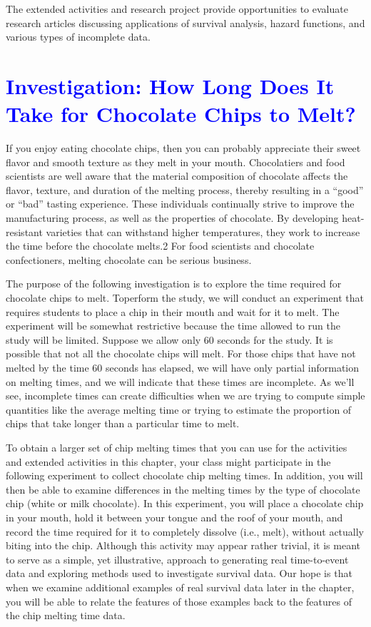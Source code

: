 \documentclass[
]{report}
\begin{document}
The extended activities and research project provide opportunities to evaluate research articles discussing applications of survival analysis, hazard functions, and various types of incomplete data.

\newpage

\hypertarget{section-77}{%
\section{\texorpdfstring{\textcolor{blue}{Investigation: How Long Does It Take for Chocolate Chips to Melt?}}{}}\label{section-77}}

If you enjoy eating chocolate chips, then you can probably appreciate their sweet flavor and smooth texture as they melt in your mouth. Chocolatiers and food scientists are well aware that the material composition of chocolate affects the flavor, texture, and duration of the melting process, thereby resulting in a ``good'' or ``bad'' tasting experience. These individuals continually strive to improve the manufacturing process, as well as the properties of chocolate. By developing heat-resistant varieties that can withstand higher temperatures, they work to increase the time before the chocolate melts.2 For food scientists and chocolate confectioners, melting chocolate can be serious business.

The purpose of the following investigation is to explore the time required for chocolate chips to melt. Toperform the study, we will conduct an experiment that requires students to place a chip in their mouth and wait for it to melt. The experiment will be somewhat restrictive because the time allowed to run the study will be limited. Suppose we allow only 60 seconds for the study. It is possible that not all the chocolate chips will melt. For those chips that have not melted by the time 60 seconds has elapsed, we will have only partial
information on melting times, and we will indicate that these times are incomplete. As we'll see, incomplete times can create difficulties when we are trying to compute simple quantities like the average melting time or trying to estimate the proportion of chips that take longer than a particular time to melt.

To obtain a larger set of chip melting times that you can use for the activities and extended activities in this chapter, your class might participate in the following experiment to collect chocolate chip melting times. In addition, you will then be able to examine differences in the melting times by the type of chocolate
chip (white or milk chocolate). In this experiment, you will place a chocolate chip in your mouth, hold it between your tongue and the roof of your mouth, and record the time required for it to completely dissolve (i.e., melt), without actually biting into the chip. Although this activity may appear rather trivial, it is meant to serve as a simple, yet illustrative, approach to generating real time-to-event data and exploring methods used to investigate survival data. Our hope is that when we examine additional examples of real survival data
later in the chapter, you will be able to relate the features of those examples back to the features of the chip
melting time data.
\end{document}
